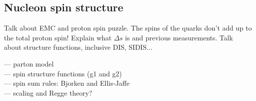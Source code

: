 \subsection{Nucleon spin structure}\label{sec:nucleonbsm}
  Talk about EMC and proton spin puzzle. The spins of the quarks don't add up
  to the total proton spin! Explain what $\Delta s$ is and previous
  measurements. Talk about structure functions, inclusive DIS, SIDIS...

  --- parton model \\
  --- spin structure functions (g1 and g2) \\
  --- spin sum rules: Bjorken and Ellis-Jaffe \\

  --- scaling and Regge theory?

